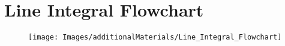 \section{Line Integral Flowchart}

\begin{figure}[h]
	\centering
	\hspace*{-1.5in}
	\texttt{[image: Images/additionalMaterials/Line\_Integral\_Flowchart]}
\end{figure}

\pagebreak